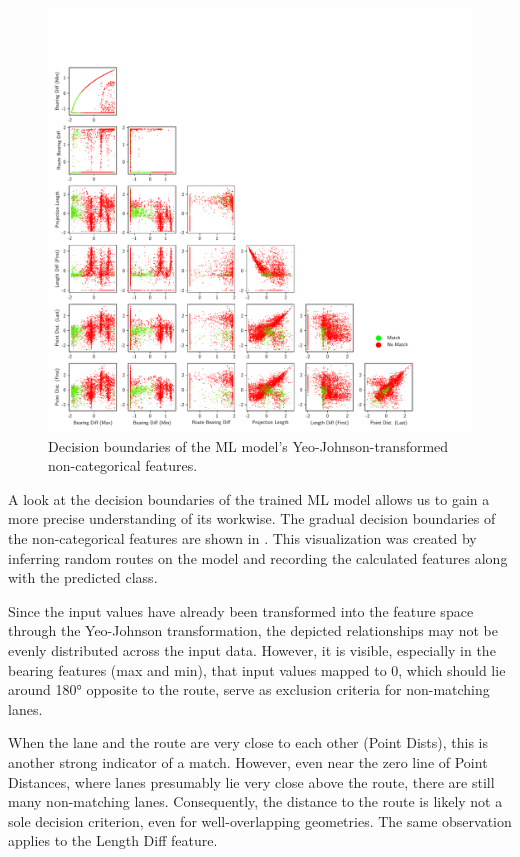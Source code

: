 \begin{figure}[!t]
\centering 
\includegraphics[width=\linewidth,bb=0 0 760 760]{images/decision-boundaries.pdf}
\caption{Decision boundaries of the ML model's Yeo-Johnson-transformed non-categorical features.}
\label{fig:ml-model-decision-boundaries}
\end{figure}

A look at the decision boundaries of the trained ML model allows us to gain a more precise understanding of its workwise. The gradual decision boundaries of the non-categorical features are shown in . This visualization was created by inferring random routes on the model and recording the calculated features along with the predicted class. 

Since the input values have already been transformed into the feature space through the Yeo-Johnson transformation, the depicted relationships may not be evenly distributed across the input data. However, it is visible, especially in the bearing features (max and min), that input values mapped to 0, which should lie around 180° opposite to the route, serve as exclusion criteria for non-matching lanes.

When the lane and the route are very close to each other (Point Dists), this is another strong indicator of a match. However, even near the zero line of Point Distances, where lanes presumably lie very close above the route, there are still many non-matching lanes. Consequently, the distance to the route is likely not a sole decision criterion, even for well-overlapping geometries. The same observation applies to the Length Diff feature.


